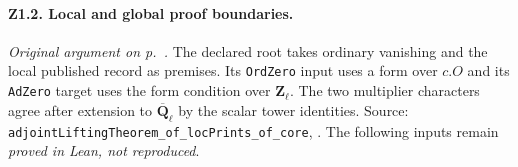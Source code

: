\paragraph{Z1.2. Local and global proof boundaries.}\label{r6:review:Z1.2} \emph{Original argument on p.~\pageref{sec:P-r5-z12}.} 
The declared root takes ordinary vanishing and the local published record as premises. Its \nolinkurl{OrdZero} input uses a form over $c.O$ and its \nolinkurl{AdZero} target uses the form condition over $\mathbf Z_\ell$. The two multiplier characters agree after extension to $\overline{\mathbf Q}_\ell$ by the scalar tower identities. Source: \nolinkurl{adjointLiftingTheorem_of_locPrints_of_core}, . The following inputs remain \emph{proved in Lean, not reproduced}.
